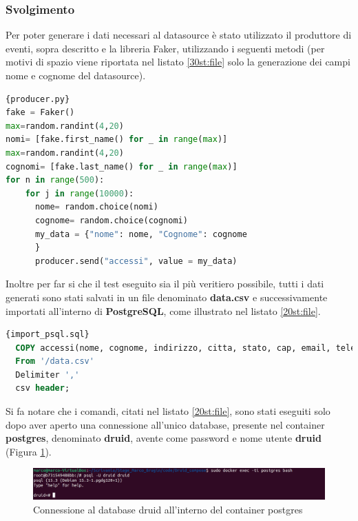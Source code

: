 \subsubsection{Svolgimento}
Per poter generare i dati necessari al \gls{datasource}{} è stato utilizzato il produttore di eventi, sopra descritto e la libreria \gls{Faker}{}, utilizzando i seguenti metodi (per motivi di spazio viene riportata nel listato \ref{30st:file} solo la generazione 
dei campi nome e cognome del \gls{datasource}{}).
\pagebreak
\begin{lstlisting}[language=Python, caption=\texttt{producer.py}, label=30st:file]{producer.py}
fake = Faker()
max=random.randint(4,20)  
nomi= [fake.first_name() for _ in range(max)]
max=random.randint(4,20)
cognomi= [fake.last_name() for _ in range(max)]
for n in range(500):
    for j in range(10000):
      nome= random.choice(nomi)
      cognome= random.choice(cognomi)
      my_data = {"nome": nome, "Cognome": cognome
      }
      producer.send("accessi", value = my_data) 
\end{lstlisting}
Inoltre per far si che il test eseguito sia il più veritiero possibile, tutti i dati generati 
sono stati salvati in un file denominato \textbf{data.csv} e successivamente importati all'interno di \textbf{PostgreSQL}, come illustrato nel listato \ref{20st:file}.
\begin{lstlisting}[language=SQL, caption=\texttt{import\_psql.sql}, label=20st:file]{import_psql.sql}
  COPY accessi(nome, cognome, indirizzo, citta, stato, cap, email, telefono, eta, altezza, peso, reddito, datan, professione, istruzione, hobby, nfigli, codice_cliente, datareg, __time)
  From '/data.csv'
  Delimiter ','
  csv header;
\end{lstlisting}
Si fa notare che i comandi, citati nel listato \ref{20st:file}, sono stati eseguiti solo dopo
aver aperto una connessione all'unico database, presente nel \gls{container}{} \textbf{postgres}, denominato \textbf{druid}, avente come password e nome utente \textbf{druid} (Figura \ref{fig:accesso_psql}).
\begin{figure}[h]
  \centering
  \includegraphics[width=1\textwidth]{images/percorso/accesso_psql.png}
  \caption{Connessione al database druid all'interno del container postgres}
  \label{fig:accesso_psql}
\end{figure}
\\
